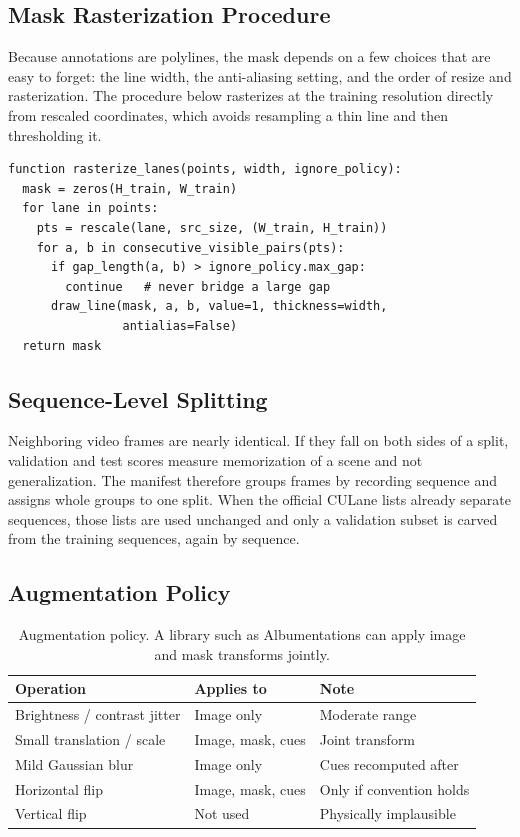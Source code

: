\documentclass[10pt,a4paper,twocolumn]{article}
\begin{document}
\subsection{Mask Rasterization Procedure}
Because annotations are polylines, the mask depends on a few choices that are easy to forget: the line width, the anti-aliasing setting, and the order of resize and rasterization. The procedure below rasterizes at the training resolution directly from rescaled coordinates, which avoids resampling a thin line and then thresholding it.

\begin{lstlisting}[caption={Lane polyline rasterization.}]
function rasterize_lanes(points, width, ignore_policy):
  mask = zeros(H_train, W_train)
  for lane in points:
    pts = rescale(lane, src_size, (W_train, H_train))
    for a, b in consecutive_visible_pairs(pts):
      if gap_length(a, b) > ignore_policy.max_gap:
        continue   # never bridge a large gap
      draw_line(mask, a, b, value=1, thickness=width,
                antialias=False)
  return mask
\end{lstlisting}

\subsection{Sequence-Level Splitting}
Neighboring video frames are nearly identical. If they fall on both sides of a split, validation and test scores measure memorization of a scene and not generalization. The manifest therefore groups frames by recording sequence and assigns whole groups to one split. When the official CULane lists already separate sequences, those lists are used unchanged and only a validation subset is carved from the training sequences, again by sequence.

\subsection{Augmentation Policy}
\begin{table}[H]
\centering
\caption{Augmentation policy. A library such as Albumentations \cite{buslaev2020} can apply image and mask transforms jointly.}
\footnotesize
\begin{tabularx}{\columnwidth}{|l|l|X|}
\hline
\rowcolor{gray!18}\textbf{Operation}&\textbf{Applies to}&\textbf{Note}\\ \hline
Brightness / contrast jitter & Image only & Moderate range\\ \hline
Small translation / scale & Image, mask, cues & Joint transform\\ \hline
Mild Gaussian blur & Image only & Cues recomputed after\\ \hline
Horizontal flip & Image, mask, cues & Only if convention holds\\ \hline
Vertical flip & Not used & Physically implausible\\ \hline
\end{tabularx}
\end{table}
\end{document}
